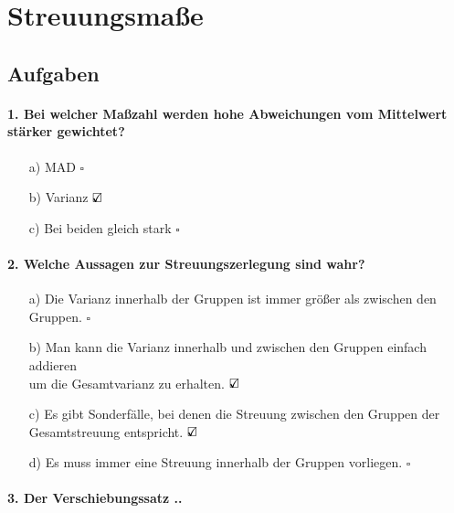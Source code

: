 \documentclass[a4paper]{article}
\begin{document}
\clearpage


\section{Streuungsmaße}

\subsection{Aufgaben}

\paragraph{1. Bei welcher Maßzahl werden hohe Abweichungen vom Mittelwert stärker gewichtet?}

\begin{itemize}
    \item[a)] MAD \hfill $\square$
    \item[b)] Varianz   \hfill $\text{\rlap{$\checkmark$}}\square$
    \item[c)] Bei beiden gleich stark \hfill $\square$
\end{itemize}

\paragraph{2. Welche Aussagen zur Streuungszerlegung sind wahr?}

\begin{itemize}
    \item[a)] Die Varianz innerhalb der Gruppen ist immer größer als zwischen den Gruppen. \hfill $\square$
    \item[b)] Man kann die Varianz innerhalb und zwischen den Gruppen einfach addieren\\um die Gesamtvarianz zu erhalten. \hfill $\text{\rlap{$\checkmark$}}\square$
    \item[c)] Es gibt Sonderfälle, bei denen die Streuung zwischen den Gruppen der\\Gesamtstreuung entspricht. \hfill $\text{\rlap{$\checkmark$}}\square$
    \item[d)] Es muss immer eine Streuung innerhalb der Gruppen vorliegen. \hfill $\square$
\end{itemize}

\paragraph{3. Der Verschiebungssatz ..}
\end{document}
